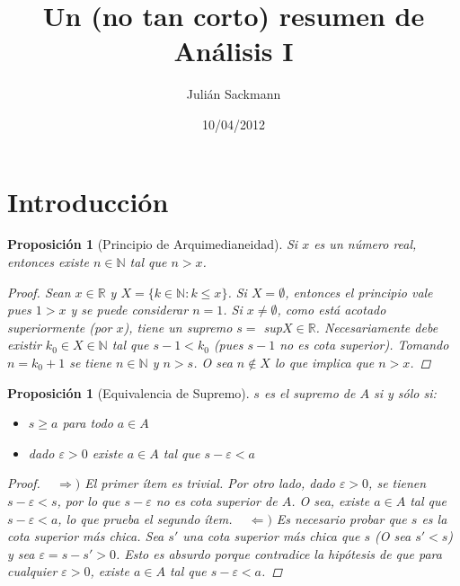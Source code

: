 \documentclass[]{article}
\title{Un (no tan corto) resumen de Análisis I}
\author{ Julián Sackmann }
\date{10/04/2012}
\newtheorem{prop}[teo]{Proposición}
\def\N{\mathbb{N}}
\def\R{\mathbb{R}}
\def\e{\varepsilon}
\begin{document}
\ifpdf
{}
\else
{}
\fi

\maketitle

\section{Introducción}
\begin{prop}[Principio de Arquimedianeidad]
	Si $x$ es un número real, entonces existe $n \in \N$ tal que $n > x$.
\begin{proof}
	Sean $x \in \R$ y $X = \{k \in \N : k \leq x \}$. Si $X = \emptyset$, entonces el principio vale pues $1 > x$ y se puede considerar $n = 1$. Si $x \neq \emptyset$, como está acotado superiormente (por $x$), tiene un supremo $s =$ sup$ X \in \R$. Necesariamente debe existir $k_0 \in X \in \N$ tal que $s - 1 < k_0$ (pues $s - 1$ no es cota superior). Tomando $n = k_0 + 1$ se tiene $n \in \N$ y $n > s$. O sea $n \not\in X$ lo que implica que $n > x$.
\end{proof}
\end{prop}

\begin{prop}[Equivalencia de Supremo]
	$s$ es el supremo de $A$ si y sólo si:
	\begin{itemize}
		\item $s \geq a$ para todo $a \in A$
		\item dado $\e > 0$ existe $a \in A$ tal que $s - \e < a$
	\end{itemize}
\begin{proof}
	~\newline
	$\Rightarrow)$ El primer ítem es trivial. Por otro lado, dado $\e > 0$, se tienen $s - \e < s$, por lo que $s - \e$ no es cota superior de $A$. O sea, existe $a \in A$ tal que $s-\e<a$, lo que prueba el segundo ítem.\newline
	~\newline
	$\Leftarrow)$ Es necesario probar que $s$ es la cota superior más chica. Sea $s'$ una cota superior más chica que $s$ (O sea $s' < s$) y sea $\e=s-s'>0$. Esto es absurdo porque contradice la hipótesis de que para cualquier $\e>0$, existe $a\in A$ tal que $s-\e<a$.
\end{proof}
\end{prop}

\newpage
\end{document}
